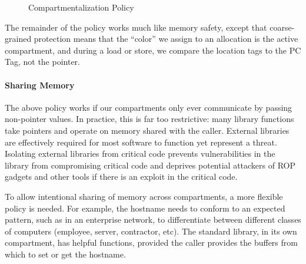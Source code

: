 \documentclass{llncs}
\begin{document}
{\begin{figure}
\begin{minipage}[t]{0.25\textwidth}
  \end{minipage}
    
  \caption{Compartmentalization Policy}
  \label{fig:compartments}
\end{figure}



The remainder of the policy works much like memory safety, except that coarse-grained
protection means that the ``color'' we assign to an allocation is the active compartment,
and during a load or store, we compare the location tags to the PC Tag, not the pointer.

\paragraph{Sharing Memory}


The above policy works if our compartments only ever communicate by passing
non-pointer values. In practice, this is far too restrictive: many library functions 
take pointers and operate on memory shared with the caller.  External libraries are
effectively required for most software to function yet represent a threat. Isolating 
external libraries from critical code prevents vulnerabilities in the library from 
compromising critical code and deprives potential attackers of ROP gadgets and other
tools if there is an exploit in the critical code.

To allow intentional sharing of memory across compartments, a more flexible policy is needed. 
For example, the hostname needs to conform to an expected pattern, 
such as in an enterprise network, to differentiate between different classes of
computers (employee, server, contractor, etc). The standard library, 
in its own compartment, has helpful functions, 
provided the caller provides the buffers from which to set or get the hostname. 

}
\end{document}
